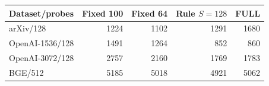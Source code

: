 \begin{tabular}{@{}lrrrr@{}}
\toprule
Dataset/probes & Fixed 100 & Fixed 64 & Rule $S=128$ & FULL \\
\midrule
arXiv/128 & 1224 & 1102 & 1291 & 1680 \\
OpenAI-1536/128 & 1491 & 1264 & 852 & 860 \\
OpenAI-3072/128 & 2757 & 2160 & 1769 & 1783 \\
BGE/512 & 5185 & 5018 & 4921 & 5062 \\
\bottomrule
\end{tabular}
